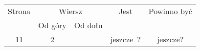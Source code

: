 \documentclass[a4paper,11pt]{article}
\numberwithin{equation}{section}
\begin{document}
\begin{center}
  \begin{tabular}{|c|c|c|c|c|}
    \hline
    Strona & \multicolumn{2}{c|}{Wiersz} & Jest
                              & Powinno być \\ \cline{2-3}
    & Od góry & Od dołu & & \\
    \hline
    11 & \hphantom{0}2 & & jeszcze~? & jeszcze? \\

\end{tabular}
\end{center}
\end{document}

